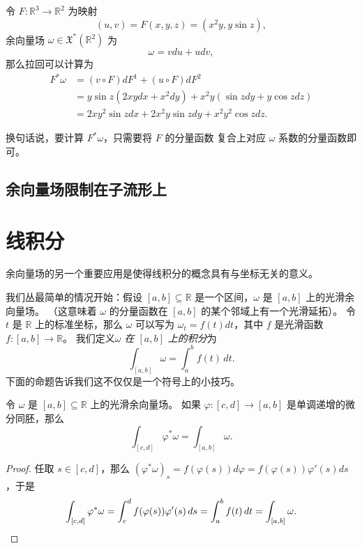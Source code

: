 \documentclass[fontset=none]{Notes}
\begin{document}
\begin{example}
  令 $F:\mathbb{R}^3\to \mathbb{R}^2$ 为映射
  \[
    (u,v)=F(x,y,z) =(x^2y,y\sin z),
  \]
  余向量场 $\omega\in \mathfrak{X}^*(\mathbb{R}^2)$ 为
  \[
    \omega=vdu+udv,  
  \]
  那么拉回可以计算为
  \begin{align*}
    F^*\omega&=(v\circ F)dF^1+(u\circ F)dF^2\\
    &=y\sin z (2xydx+x^2dy)+x^2y(\sin zdy+y\cos zdz)\\
    &=2xy^2\sin z dx+2x^2y\sin zdy+x^2y^2\cos zdz.
  \end{align*}
\end{example}

换句话说，要计算 $F^*\omega$，只需要将 $F$ 的分量函数
复合上对应 $\omega$ 系数的分量函数即可。

\subsection{余向量场限制在子流形上}



\section{线积分}

余向量场的另一个重要应用是使得线积分的概念具有与坐标无关的意义。

我们丛最简单的情况开始：假设 $[a,b]\subseteq \mathbb{R}$
是一个区间，$\omega$ 是 $[a,b]$ 上的光滑余向量场。
（这意味着 $\omega$ 的分量函数在 $[a,b]$ 的某个邻域上有一个光滑延拓）。
令 $t$ 是 $\mathbb{R}$ 上的标准坐标，那么 $\omega$ 可以写为
$\omega_t=f(t)dt$，其中 $f$ 是光滑函数 $f:[a,b]\to \mathbb{R}$。
我们定义\emph{$\omega$ 在 $[a,b]$ 上的积分}为
\[
  \int_{[a,b]}\omega=\int_a^b f(t) \, dt.  
\]
下面的命题告诉我们这不仅仅是一个符号上的小技巧。

\begin{proposition}[积分的微分同胚不变性]\label{prop:diffeomorphic invariance of line integral}
  令 $\omega$ 是 $[a,b]\subseteq \mathbb{R}$ 上的光滑余向量场。
  如果 $\varphi:[c,d]\to[a,b]$ 是单调递增的微分同胚，那么
  \[
    \int_{[c,d]}\varphi^*\omega=\int_{[a,b]}\omega.  
  \]
\end{proposition}
\begin{proof}
  任取 $s\in [c,d]$，那么 
  $(\varphi^*\omega)_s=f(\varphi(s)) d\varphi=f(\varphi(s))\varphi'(s)ds$，于是
  \[
    \int_{[c,d]}\varphi^*\omega=\int_c^d f(\varphi(s))\varphi'(s)\, ds
    =\int_a^b f(t)\, dt=\int_{[a,b]}\omega.\qedhere
  \]
\end{proof}
\end{document}
